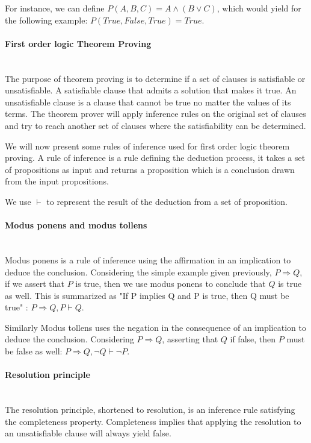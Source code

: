 For instance, we can define $P(A,B,C) = A \wedge (B \vee C)$, which would yield for the following example: $P(True,False,True)=True$.

\paragraph{First order logic Theorem Proving}\textbf{\\}
The purpose of theorem proving is to determine if a set of clauses is satisfiable or unsatisfiable.
A satisfiable clause that admits a solution that makes it true.
An unsatisfiable clause is a clause that cannot be true no matter the values of its terms.
The theorem prover will apply inference rules on the original set of clauses and try to reach another set of clauses where the satisfiability can be determined.

We will now present some rules of inference used for first order logic theorem proving.
A rule of inference is a rule defining the deduction process, it takes a set of propositions as input and returns a proposition which is a conclusion drawn from the input propositions.

We use $\vdash$ to represent the result of the deduction from a set of proposition.

\paragraph{Modus ponens and modus tollens}\textbf{\\}
Modus ponens is a rule of inference using the affirmation in an implication to deduce the conclusion.
Considering the simple example given previously, $P \Rightarrow Q$, if we assert that $P$ is true, then we use modus ponens to conclude that $Q$ is true as well. This is summarized as "If P implies Q and P is true, then Q must be true" : $P \Rightarrow Q, P \vdash Q$.

Similarly Modus tollens uses the negation in the consequence of an implication to deduce the conclusion.
Considering $P \Rightarrow Q$, asserting that $Q$ if false, then $P$ must be false as well: $P \Rightarrow Q, \neg Q \vdash \neg P$.

\paragraph{Resolution principle}\textbf{\\}
The resolution principle, shortened to resolution, is an inference rule satisfying the completeness property. Completeness implies that applying the resolution to an unsatisfiable clause will always yield false. 

